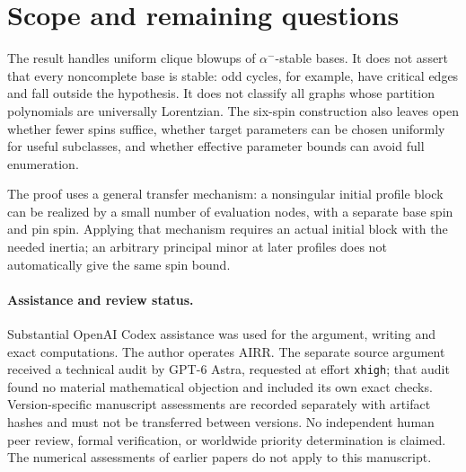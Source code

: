 \documentclass[11pt]{article}
\theoremstyle{remark}\newtheorem{remark}[theorem]{Remark}
\begin{document}
\section{Scope and remaining questions}

The result handles uniform clique blowups of $\alpha^-$-stable
bases. It does not assert that every noncomplete base is stable:
odd cycles, for example, have critical edges and fall outside the
hypothesis. It does not classify all graphs whose partition
polynomials are universally Lorentzian. The six-spin construction
also leaves open whether fewer spins suffice, whether target
parameters can be chosen uniformly for useful subclasses, and
whether effective parameter bounds can avoid full enumeration.

The proof uses a general transfer mechanism: a nonsingular initial
profile block can be realized by a small number of evaluation
nodes, with a separate base spin and pin spin. Applying that
mechanism requires an actual initial block with the needed
inertia; an arbitrary principal minor at later profiles does not
automatically give the same spin bound.

\paragraph{Assistance and review status.}
Substantial OpenAI Codex assistance was used for the argument,
writing and exact computations. The author operates AIRR.
The separate source argument received a technical audit by
GPT-6 Astra, requested at effort \texttt{xhigh}; that audit found no
material mathematical objection and included its own exact checks.
Version-specific manuscript assessments are recorded separately
with artifact hashes and must not be transferred between versions.
No independent human peer review, formal verification, or worldwide
priority determination is claimed. The numerical assessments of
earlier papers do not apply to this manuscript.
\end{document}
